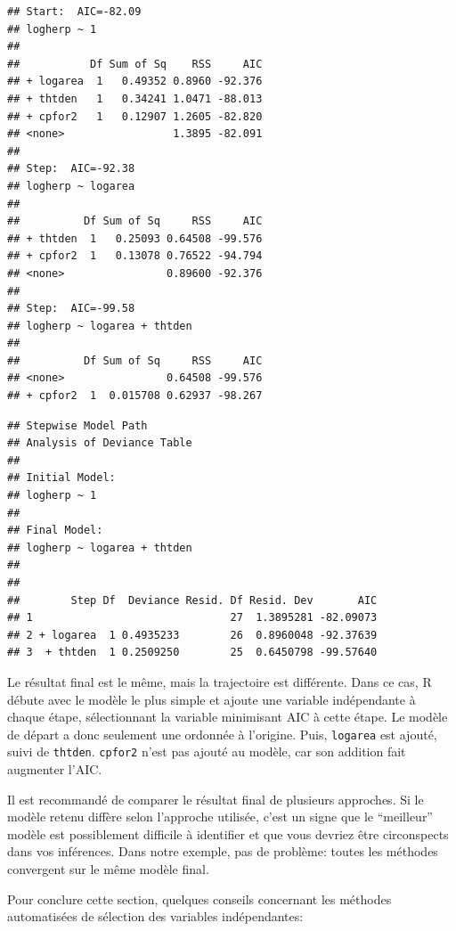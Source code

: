 \documentclass[
  12pt,
]{book}
\newenvironment{Shaded}{\begin{snugshade}}{\end{snugshade}}
\newcommand{\CommentTok}[1]{\textcolor[rgb]{0.56,0.35,0.01}{\textit{#1}}}
\newcommand{\NormalTok}[1]{#1}
\newcommand{\OperatorTok}[1]{\textcolor[rgb]{0.81,0.36,0.00}{\textbf{#1}}}
\begin{document}
\begin{verbatim}
## Start:  AIC=-82.09
## logherp ~ 1
## 
##           Df Sum of Sq    RSS     AIC
## + logarea  1   0.49352 0.8960 -92.376
## + thtden   1   0.34241 1.0471 -88.013
## + cpfor2   1   0.12907 1.2605 -82.820
## <none>                 1.3895 -82.091
## 
## Step:  AIC=-92.38
## logherp ~ logarea
## 
##          Df Sum of Sq     RSS     AIC
## + thtden  1   0.25093 0.64508 -99.576
## + cpfor2  1   0.13078 0.76522 -94.794
## <none>                0.89600 -92.376
## 
## Step:  AIC=-99.58
## logherp ~ logarea + thtden
## 
##          Df Sum of Sq     RSS     AIC
## <none>                0.64508 -99.576
## + cpfor2  1  0.015708 0.62937 -98.267
\end{verbatim}

\begin{Shaded}
\end{Shaded}

\begin{verbatim}
## Stepwise Model Path 
## Analysis of Deviance Table
## 
## Initial Model:
## logherp ~ 1
## 
## Final Model:
## logherp ~ logarea + thtden
## 
## 
##        Step Df  Deviance Resid. Df Resid. Dev       AIC
## 1                               27  1.3895281 -82.09073
## 2 + logarea  1 0.4935233        26  0.8960048 -92.37639
## 3  + thtden  1 0.2509250        25  0.6450798 -99.57640
\end{verbatim}

Le résultat final est le même, mais la trajectoire est différente. Dans ce cas, R débute avec le modèle le plus simple et ajoute une variable indépendante à chaque étape, sélectionnant la variable minimisant AIC à cette étape. Le modèle de départ a donc seulement une ordonnée à l'origine. Puis, \texttt{logarea} est ajouté, suivi de \texttt{thtden}. \texttt{cpfor2} n'est pas ajouté au modèle, car son addition fait augmenter l'AIC.

Il est recommandé de comparer le résultat final de plusieurs approches. Si le modèle retenu diffère selon l'approche utilisée, c'est un signe que le ``meilleur'' modèle est possiblement difficile à identifier et que vous devriez être circonspects dans vos inférences. Dans notre exemple, pas de problème: toutes les méthodes convergent sur le même modèle final.

Pour conclure cette section, quelques conseils concernant les méthodes automatisées de sélection des variables indépendantes:
\end{document}
